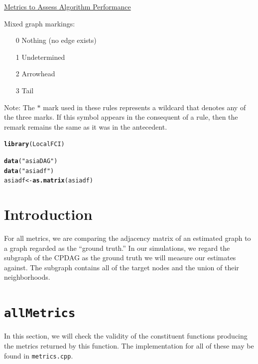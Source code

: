 \documentclass[12pt]{article}\usepackage[]{graphicx}\usepackage[]{xcolor}
\makeatletter
\newcommand{\hlstr}[1]{\textcolor[rgb]{0.192,0.494,0.8}{#1}}%
\newcommand{\hlstd}[1]{\textcolor[rgb]{0.345,0.345,0.345}{#1}}%
\newcommand{\hlkwb}[1]{\textcolor[rgb]{0.69,0.353,0.396}{#1}}%
\newcommand{\hlkwd}[1]{\textcolor[rgb]{0.737,0.353,0.396}{\textbf{#1}}}%
\newenvironment{kframe}{%
 \def\at@end@of@kframe{}%
 \ifinner\ifhmode%
  \def\at@end@of@kframe{\end{minipage}}%
  \begin{minipage}{\columnwidth}%
 \fi\fi%
 \def\FrameCommand##1{\hskip\@totalleftmargin \hskip-\fboxsep
 \colorbox{shadecolor}{##1}\hskip-\fboxsep
     \hskip-\linewidth \hskip-\@totalleftmargin \hskip\columnwidth}%
 \MakeFramed {\advance\hsize-\width
   \@totalleftmargin\z@ \linewidth\hsize
   \@setminipage}}%
 {\par\unskip\endMakeFramed%
 \at@end@of@kframe}
\newenvironment{knitrout}{}{} %
\makeatother
\begin{document}
\begin{center}
\Large \underline{Metrics to Assess Algorithm Performance}
\end{center}

Mixed graph markings:
\begin{enumerate}
\item[0] Nothing (no edge exists)
\item[1] Undetermined 
\item[2] Arrowhead
\item[3] Tail
\end{enumerate}
Note: The $\ast$ mark used in these rules represents a wildcard that denotes any of the three marks. If this symbol appears in the consequent of a rule, then the remark remains the same as it was in the antecedent.

\begin{knitrout}
\color{fgcolor}\begin{kframe}
\begin{alltt}
\hlkwd{library}\hlstd{(LocalFCI)}
\end{alltt}


{\ttfamily\noindent\itshape\color{messagecolor}{\#\# Loading required package: bnlearn}}\begin{alltt}
\hlkwd{data}\hlstd{(}\hlstr{"asiaDAG"}\hlstd{)}
\hlkwd{data}\hlstd{(}\hlstr{"asiadf"}\hlstd{)}
\hlstd{asiadf} \hlkwb{<-} \hlkwd{as.matrix}\hlstd{(asiadf)}
\end{alltt}
\end{kframe}
\end{knitrout}

\section*{Introduction}
For all metrics, we are comparing the adjacency matrix of an estimated graph to a graph regarded as the ``ground truth.'' In our simulations, we regard the subgraph of the CPDAG as the ground truth we will measure our estimates against. The subgraph contains all of the target nodes and the union of their neighborhoods.

\section*{\texttt{allMetrics}}
In this section, we will check the validity of the constituent functions producing the metrics returned by this function. The implementation for all of these may be found in \texttt{metrics.cpp}.
\newpage
\end{document}
